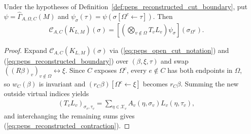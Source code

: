 \begin{lemma}%
    \label{thm:peps_reconstructed_boundary_contraction}
    \leanok
    Under the hypotheses of
    Definition~\ref{def:peps_reconstructed_cut_boundary}, put
    $\psi=\widehat\Gamma_{A,\Omega,C}(M)$ and
    $\psi_\sigma(\tau)=\psi(\sigma[\Omega^c\leftarrow\tau])$.
    Then
    \begin{align}
        \mathcal C_{A,C}(K_{L,M})(\sigma)
        =\left[\left(\bigotimes_{v\notin\Omega}T_vL_v\right)
            \psi_\sigma\right](\sigma_{\Omega^c}).
        \label{eq:peps_reconstructed_contraction}
    \end{align}
\end{lemma}
\begin{proof}\leanok
    Expand $\mathcal C_{A,C}(K_{L,M})(\sigma)$ via
    (\ref{eq:peps_open_cut_notation}) and (\ref{eq:peps_reconstructed_boundary})
    over $(\beta,\xi,\tau)$ and swap $((R\beta)_v)_{v\notin\Omega}\leftrightarrow\xi$.
    Since $C$ exposes $\Omega^c$, every $e\notin C$ has both endpoints in
    $\Omega$, so $w_C(\beta)$ is invariant and
    $(r_C\beta)[\Omega^c\leftarrow\xi]$ becomes $r_C\beta$. Summing the new
    outside virtual indices yields
    \begin{align}
        (T_vL_v)_{\sigma_v,\tau_v}
        =\sum_{\eta\in\mathcal X_v}A_v(\eta,\sigma_v)L_v(\eta,\tau_v),
        \label{eq:peps_outside_local_composition}
    \end{align}
    and interchanging the remaining sums gives (\ref{eq:peps_reconstructed_contraction}).
\end{proof}

